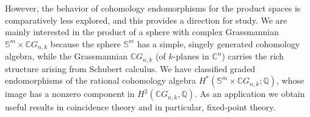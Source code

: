\documentclass{amsart}
\begin{document}
    However, the behavior of cohomology endomorphisms for the product spaces is comparatively less explored, and this provides a direction for study.
    We are mainly interested in the product of a sphere
	with complex Grassmannian $\mathbb S^m\times \mathbb CG_{n,k}$ because the sphere $\mathbb{S}^m$ has a %
simple, singely generated %
cohomology algebra, while the Grassmannian $\mathbb{C}G_{n,k}$ (of $k$-planes in $\mathbb C^n$)
	carries the rich structure arising from Schubert calculus. We have classified graded endomorphisms of the rational cohomology algebra $H^*(\mathbb{S}^m \times \mathbb{C}G_{n,k};\mathbb{Q})$, whose image has a nonzero component in $H^2(\mathbb CG_{n,k},\mathbb Q)$.  As an application we obtain useful results in coincidence %
theory and in %
particular, fixed-point theory.  
	
\end{document}
